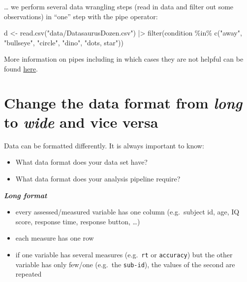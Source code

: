 \documentclass[
  letterpaper,
  DIV=11,
  numbers=noendperiod,
  oneside]{scrreprt}
\newenvironment{Shaded}{\begin{snugshade}}{\end{snugshade}}
\newcommand{\FunctionTok}[1]{\textcolor[rgb]{0.28,0.35,0.67}{#1}}
\newcommand{\NormalTok}[1]{\textcolor[rgb]{0.00,0.23,0.31}{#1}}
\newcommand{\OtherTok}[1]{\textcolor[rgb]{0.00,0.23,0.31}{#1}}
\newcommand{\SpecialCharTok}[1]{\textcolor[rgb]{0.37,0.37,0.37}{#1}}
\newcommand{\StringTok}[1]{\textcolor[rgb]{0.13,0.47,0.30}{#1}}
\begin{document}
\ldots{} we perform several data wrangling steps (read in data and
filter out some observations) in ``one'' step with the pipe operator:

\begin{Shaded}
\begin{Highlighting}[]
\NormalTok{d }\OtherTok{\textless{}{-}} \FunctionTok{read.csv}\NormalTok{(}\StringTok{"data/DatasaurusDozen.csv"}\NormalTok{) }\SpecialCharTok{|\textgreater{}}
    \FunctionTok{filter}\NormalTok{(condition }\SpecialCharTok{\%in\%} \FunctionTok{c}\NormalTok{(}\StringTok{"away"}\NormalTok{, }\StringTok{"bullseye"}\NormalTok{, }\StringTok{"circle"}\NormalTok{, }\StringTok{"dino"}\NormalTok{, }\StringTok{"dots, star"}\NormalTok{))}
\end{Highlighting}
\end{Shaded}

More information on pipes including in which cases they are not helpful
can be found
\href{https://r4ds.had.co.nz/pipes.html\#when-not-to-use-the-pipe}{here}.

\hypertarget{change-the-data-format-from-long-to-wide-and-vice-versa}{%
\section{\texorpdfstring{Change the data format from \emph{long} to
\emph{wide} and vice
versa}{Change the data format from long to wide and vice versa}}\label{change-the-data-format-from-long-to-wide-and-vice-versa}}

Data can be formatted differently. It is always important to know:

\begin{itemize}
\item
  What data format does your data set have?
\item
  What data format does your analysis pipeline require?
\end{itemize}

\textbf{\emph{Long format}}

\begin{itemize}
\item
  every assessed/measured variable has one column (e.g.~subject id, age,
  IQ score, response time, response button, \ldots)
\item
  each measure has one row
\item
  if one variable has several measures (e.g.~\texttt{rt} or
  \texttt{accuracy}) but the other variable has only few/one (e.g.~the
  \texttt{sub-id}), the values of the second are repeated
\end{itemize}
\end{document}
